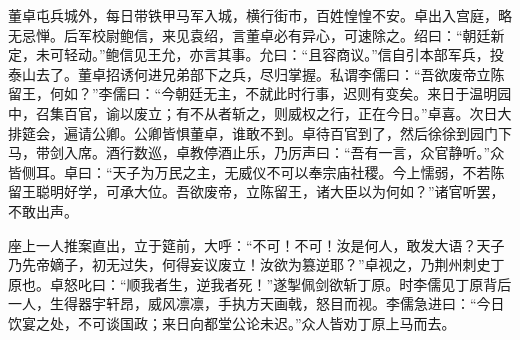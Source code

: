 董卓屯兵城外，每日带铁甲马军入城，横行街市，百姓惶惶不安。卓出入宫庭，略无忌惮。后军校尉鲍信，来见袁绍，言董卓必有异心，可速除之。绍曰：“朝廷新定，未可轻动。”鲍信见王允，亦言其事。允曰：“且容商议。”信自引本部军兵，投泰山去了。董卓招诱何进兄弟部下之兵，尽归掌握。私谓李儒曰：“吾欲废帝立陈留王，何如？”李儒曰：“今朝廷无主，不就此时行事，迟则有变矣。来日于温明园中，召集百官，谕以废立；有不从者斩之，则威权之行，正在今日。”卓喜。次日大排筵会，遍请公卿。公卿皆惧董卓，谁敢不到。卓待百官到了，然后徐徐到园门下马，带剑入席。酒行数巡，卓教停酒止乐，乃厉声曰：“吾有一言，众官静听。”众皆侧耳。卓曰：“天子为万民之主，无威仪不可以奉宗庙社稷。今上懦弱，不若陈留王聪明好学，可承大位。吾欲废帝，立陈留王，诸大臣以为何如？”诸官听罢，不敢出声。

座上一人推案直出，立于筵前，大呼：“不可！不可！汝是何人，敢发大语？天子乃先帝嫡子，初无过失，何得妄议废立！汝欲为篡逆耶？”卓视之，乃荆州刺史丁原也。卓怒叱曰：“顺我者生，逆我者死！”遂掣佩剑欲斩丁原。时李儒见丁原背后一人，生得器宇轩昂，威风凛凛，手执方天画戟，怒目而视。李儒急进曰：“今日饮宴之处，不可谈国政；来日向都堂公论未迟。”众人皆劝丁原上马而去。

